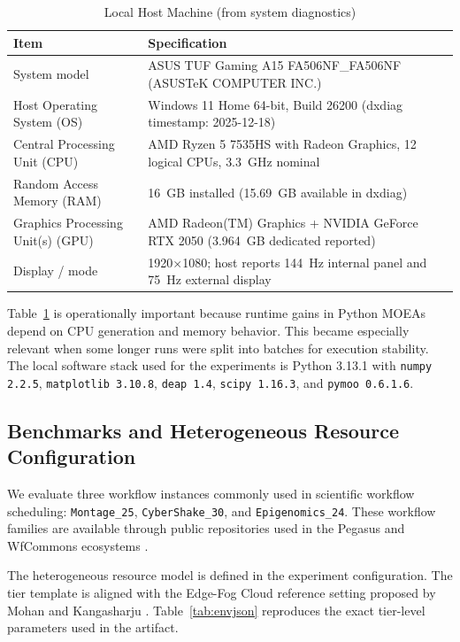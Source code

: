\documentclass[runningheads]{llncs}
\begin{document}
\begin{table}[t]
\caption{Local Host Machine (from system diagnostics)}
\label{tab:hardware}
\centering
\small
\begin{tabularx}{\textwidth}{@{}l X@{}}
\toprule
Item & Specification \\
\midrule
System model & ASUS TUF Gaming A15 FA506NF\_FA506NF (ASUSTeK COMPUTER INC.) \\
Host Operating System (OS) & Windows 11 Home 64-bit, Build 26200 (dxdiag timestamp: 2025-12-18) \\
Central Processing Unit (CPU) & AMD Ryzen 5 7535HS with Radeon Graphics, 12 logical CPUs, \SI{3.3}{GHz} nominal \\
Random Access Memory (RAM) & \SI{16}{GB} installed (\SI{15.69}{GB} available in dxdiag) \\
Graphics Processing Unit(s) (GPU) & AMD Radeon(TM) Graphics + NVIDIA GeForce RTX 2050 (\SI{3.964}{GB} dedicated reported) \\
Display / mode & 1920$\times$1080; host reports 144~Hz internal panel and 75~Hz external display \\
\bottomrule
\end{tabularx}
\end{table}

Table~\ref{tab:hardware} is operationally important because runtime gains in Python MOEAs depend on CPU generation and memory behavior. This became especially relevant when some longer runs were split into batches for execution stability. The local software stack used for the experiments is Python 3.13.1 with \texttt{numpy 2.2.5}, \texttt{matplotlib 3.10.8}, \texttt{deap 1.4}, \texttt{scipy 1.16.3}, and \texttt{pymoo 0.6.1.6}.

\subsection{Benchmarks and Heterogeneous Resource Configuration}
We evaluate three workflow instances commonly used in scientific workflow scheduling: \texttt{Montage\_25}, \texttt{CyberShake\_30}, and \texttt{Epigenomics\_24}. These workflow families are available through public repositories used in the Pegasus and WfCommons ecosystems \cite{coleman2021wfcommons}.

The heterogeneous resource model is defined in the experiment configuration. The tier template is aligned with the Edge-Fog Cloud reference setting proposed by Mohan and Kangasharju \cite{mohan2016edgefog}. Table~\ref{tab:envjson} reproduces the exact tier-level parameters used in the artifact.
\end{document}
